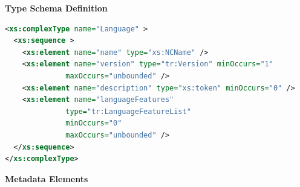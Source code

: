 \documentclass{ivoa}
\begin{document}


\vspace{1ex}\noindent\textbf{ Type Schema Definition}

\begin{lstlisting}[language=XML,basicstyle=\footnotesize]
<xs:complexType name="Language" >
  <xs:sequence >
    <xs:element name="name" type="xs:NCName" />
    <xs:element name="version" type="tr:Version" minOccurs="1"
              maxOccurs="unbounded" />
    <xs:element name="description" type="xs:token" minOccurs="0" />
    <xs:element name="languageFeatures"
              type="tr:LanguageFeatureList"
              minOccurs="0"
              maxOccurs="unbounded" />
  </xs:sequence>
</xs:complexType>
\end{lstlisting}

\vspace{0.5ex}\noindent\textbf{ Metadata Elements}
\end{document}
